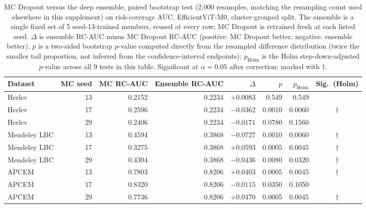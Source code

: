 \documentclass[12pt,letterpaper]{article}
\begin{document}
\begin{table}[htbp]
\centering
\caption{MC Dropout versus the deep ensemble, paired bootstrap test (2,000 resamples, matching the resampling count used elsewhere in this supplement) on risk-coverage AUC, EfficientViT-M0, cluster-grouped split. The ensemble is a single fixed set of 5 seed-13-trained members, reused at every row; MC Dropout is retrained fresh at each listed seed. $\Delta$ is ensemble RC-AUC minus MC Dropout RC-AUC (positive: MC Dropout better; negative: ensemble better). $p$ is a two-sided bootstrap $p$-value computed directly from the resampled difference distribution (twice the smaller tail proportion, not inferred from the confidence-interval endpoints); $p_{\text{Holm}}$ is the Holm step-down-adjusted $p$-value across all 9 tests in this table. Significant at $\alpha=0.05$ after correction: marked with $\dagger$.}
\label{tab:sig}
\small
\begin{tabular}{lrrrrrrc}
\toprule
Dataset & MC seed & MC RC-AUC & Ensemble RC-AUC & $\Delta$ & $p$ & $p_{\text{Holm}}$ & Sig.\ (Holm) \\
\midrule
Herlev & 13 & 0.2152 & 0.2234 & +0.0083 & 0.549 & 0.549 & \\
Herlev & 17 & 0.2596 & 0.2234 & $-0.0362$ & 0.0010 & 0.0060 & $\dagger$ \\
Herlev & 29 & 0.2406 & 0.2234 & $-0.0171$ & 0.0780 & 0.1560 & \\
Mendeley LBC & 13 & 0.4594 & 0.3868 & $-0.0727$ & 0.0010 & 0.0060 & $\dagger$ \\
Mendeley LBC & 17 & 0.3275 & 0.3868 & +0.0593 & 0.0005 & 0.0045 & $\dagger$ \\
Mendeley LBC & 29 & 0.4304 & 0.3868 & $-0.0436$ & 0.0080 & 0.0320 & $\dagger$ \\
APCEM & 13 & 0.7803 & 0.8206 & +0.0403 & 0.0005 & 0.0045 & $\dagger$ \\
APCEM & 17 & 0.8320 & 0.8206 & $-0.0115$ & 0.0350 & 0.1050 & \\
APCEM & 29 & 0.7736 & 0.8206 & +0.0470 & 0.0005 & 0.0045 & $\dagger$ \\
\bottomrule
\end{tabular}
\end{table}
\end{document}
